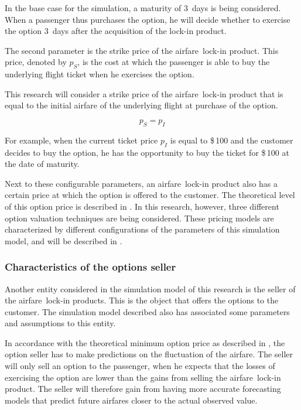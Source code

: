 In the base case for the simulation, a maturity of 3~days is being considered. When a passenger thus purchases the option, he will decide whether to exercise the option 3~days after the acquisition of the lock-in product.

The second parameter is the strike price of the airfare~lock-in product. This price, denoted by $p_S$, is the cost at which the passenger is able to buy the underlying flight ticket when he exercises the option.

This research will consider a strike price of the airfare~lock-in product that is equal to the initial airfare of the underlying flight at purchase of the option.

$$p_S = p_I$$

For example, when the current ticket price $p_I$ is equal to \$\,100 and the customer decides to buy the option, he has the opportunity to buy the ticket for \$\,100 at the date of maturity.  

Next to these configurable parameters, an airfare~lock-in product also has a certain price at which the option is offered to the customer. The theoretical level of this option price is described in . In this research, however, three different option valuation techniques are being considered. These pricing models are characterized by different configurations of the parameters of this simulation model, and will be described in .


\subsubsection{Characteristics of the options seller}
Another entity considered in the simulation model of this research is the seller of the airfare~lock-in products. This is the object that offers the options to the customer. The simulation model described also has associated some parameters and assumptions to this entity.

In accordance with the theoretical minimum option price as described in , the option seller has to make predictions on the fluctuation of the airfare. The seller will only sell an option to the passenger, when he expects that the losses of exercising the option are lower than the gains from selling the airfare~lock-in product. The seller will therefore gain from having more accurate forecasting models that predict future airfares closer to the actual observed value.

